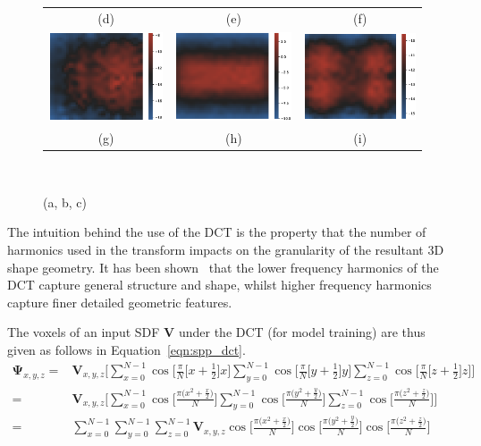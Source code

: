 \begin{figure}[!htbp]
\begin{tabular}{ccc}
    (d) & (e) & (f) \\
    \includegraphics[width=.28\linewidth]{figures/spp/car_sdf_slices/z_0.eps}&
		\includegraphics[width=.28\linewidth]{figures/spp/car_sdf_slices/z_10.eps}&
		\includegraphics[width=.28\linewidth]{figures/spp/car_sdf_slices/z_19.eps}\\
    (g) & (h) & (i)
  \end{tabular}
  \caption[SDF Slices Generated by DCT]
  {(a, b, c)}
~\label{figure:spp_sdf_slices}
\end{figure}

The intuition behind the use of the DCT is the property that the number of harmonics used 
in the transform impacts on the granularity of the resultant 3D shape geometry. It has been 
shown~\cite{Ren2014} that the lower frequency harmonics of the DCT capture general structure 
and shape, whilst higher frequency harmonics capture finer detailed geometric features.


The voxels of an input SDF \( \bm{V} \) under the DCT (for model training) are thus given 
as follows in Equation~\ref{eqn:spp_dct}.
\begin{align}
  \label{eqn:spp_dct}
  \bm{\Psi}_{x, y, z} ={}& \bm{V}_{x, y, z} \Bigg[
  \sum_{x=0}^{N-1} \cos \Big[ \frac{\pi}{N} \big[ x + \frac{1}{2} \big] x \Big]
  \sum_{y=0}^{N-1} \cos \Big[ \frac{\pi}{N} \big[ y + \frac{1}{2} \big] y \Big]
  \sum_{z=0}^{N-1} \cos \Big[ \frac{\pi}{N} \big[ z + \frac{1}{2} \big] z \Big] \Bigg]\\
  ={}& \bm{V}_{x, y, z} \Bigg[
  \sum_{x=0}^{N-1} \cos \Big[ \frac{\pi \big( x^{2} + \frac{x}{2} \big)}{N} \Big]
  \sum_{y=0}^{N-1} \cos \Big[ \frac{\pi \big( y^{2} + \frac{y}{2} \big)}{N} \Big]
  \sum_{z=0}^{N-1} \cos \Big[ \frac{\pi \big( z^{2} + \frac{z}{2} \big)}{N} \Big] \Bigg]\\
  ={}& \sum_{x=0}^{N-1} \sum_{y=0}^{N-1} \sum_{z=0}^{N-1} \bm{V}_{x, y, z}
  \cos \Big[ \frac{\pi \big( x^{2} + \frac{x}{2} \big)}{N} \Big]
  \cos \Big[ \frac{\pi \big( y^{2} + \frac{y}{2} \big)}{N} \Big]
  \cos \Big[ \frac{\pi \big( z^{2} + \frac{z}{2} \big)}{N} \Big]
\end{align}

